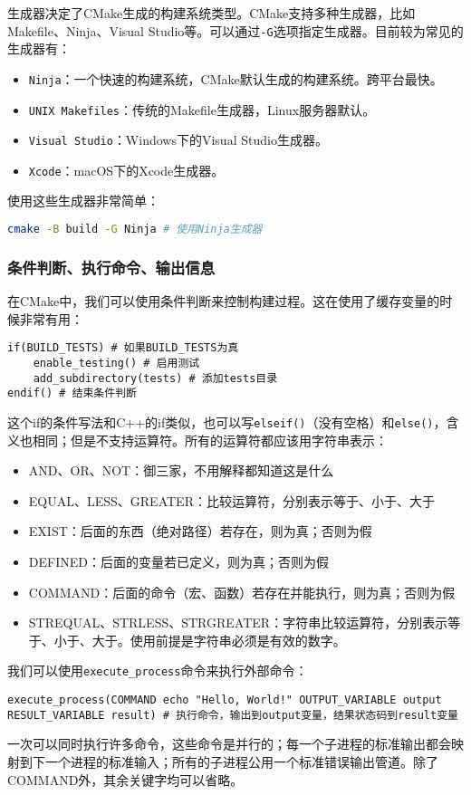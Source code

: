 \documentclass[../main.tex]{subfiles}
\begin{document}
生成器决定了CMake生成的构建系统类型。CMake支持多种生成器，比如Makefile、Ninja、Visual Studio等。可以通过\texttt{-G}选项指定生成器。目前较为常见的生成器有：

\begin{itemize}
  \item \texttt{Ninja}：一个快速的构建系统，CMake默认生成的构建系统。跨平台最快。
  \item \texttt{UNIX Makefiles}：传统的Makefile生成器，Linux服务器默认。
  \item \texttt{Visual Studio}：Windows下的Visual Studio生成器。
  \item \texttt{Xcode}：macOS下的Xcode生成器。
\end{itemize}
使用这些生成器非常简单：
\begin{lstlisting}[language=bash]
cmake -B build -G Ninja # 使用Ninja生成器
\end{lstlisting}

\subsubsection{条件判断、执行命令、输出信息}

在CMake中，我们可以使用条件判断来控制构建过程。这在使用了缓存变量的时候非常有用：
\begin{lstlisting}
if(BUILD_TESTS) # 如果BUILD_TESTS为真
    enable_testing() # 启用测试
    add_subdirectory(tests) # 添加tests目录
endif() # 结束条件判断
\end{lstlisting}

这个if的条件写法和C++的if类似，也可以写\texttt{elseif()}（没有空格）和\texttt{else()}，含义也相同；但是不支持运算符。所有的运算符都应该用字符串表示：
\begin{itemize}
  \item AND、OR、NOT：御三家，不用解释都知道这是什么
  \item EQUAL、LESS、GREATER：比较运算符，分别表示等于、小于、大于
  \item EXIST：后面的东西（绝对路径）若存在，则为真；否则为假
  \item DEFINED：后面的变量若已定义，则为真；否则为假
  \item COMMAND：后面的命令（宏、函数）若存在并能执行，则为真；否则为假
  \item STREQUAL、STRLESS、STRGREATER：字符串比较运算符，分别表示等于、小于、大于。使用前提是字符串必须是有效的数字。
\end{itemize}

我们可以使用\texttt{execute\_process}命令来执行外部命令：
\begin{lstlisting}
execute_process(COMMAND echo "Hello, World!" OUTPUT_VARIABLE output RESULT_VARIABLE result) # 执行命令，输出到output变量，结果状态码到result变量
\end{lstlisting}
一次可以同时执行许多命令，这些命令是并行的；每一个子进程的标准输出都会映射到下一个进程的标准输入；所有的子进程公用一个标准错误输出管道。除了COMMAND外，其余关键字均可以省略。
\end{document}
